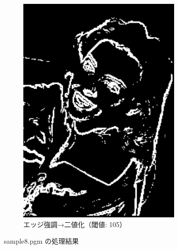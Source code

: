 \documentclass[a4paper,12pt]{jsarticle}
\begin{document}
\begin{figure}[!htbp]
\begin{subfigure}[b]{0.45\textwidth}
    \includegraphics[width=0.9\textwidth]{./images/combined_sample8_combined.png}
    \caption{エッジ強調→二値化（閾値: 105）}
\end{subfigure}
\caption{sample8.pgm の処理結果}
\label{fig:sample8}
\end{figure}
\end{document}

